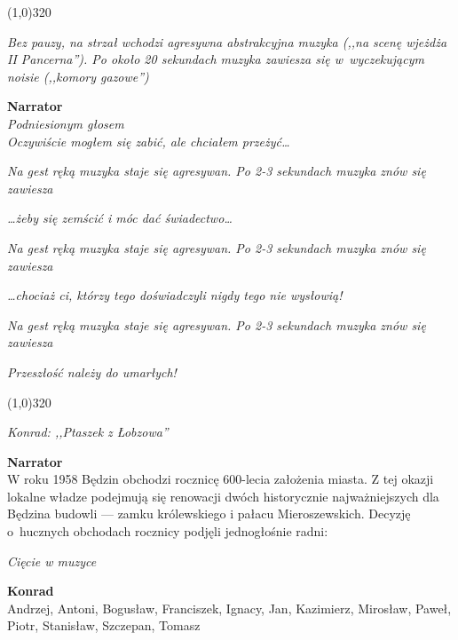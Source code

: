 \documentclass[11pt,a4paper,oneside]{article}
\begin{document}
\line(1,0){320}

{\color{light-gray} \emph{Bez pauzy, na strzał wchodzi agresywna
abstrakcyjna muzyka (,,na scenę wjeżdża II Pancerna''). Po około 20
sekundach muzyka zawiesza się w~wyczekującym noisie (,,komory
gazowe'')}}

\textbf{Narrator}\\
{\color{light-gray} \emph{Podniesionym głosem}}\\
\emph{Oczywiście mogłem się zabić, ale chciałem przeżyć\dots{}} 

{\color{light-gray} \emph{Na gest ręką muzyka staje się agresywan. Po
2-3 sekundach muzyka znów się zawiesza}}

\emph{\dots{}żeby się zemścić i móc dać świadectwo\dots{}}

{\color{light-gray} \emph{Na gest ręką muzyka staje się agresywan. Po
2-3 sekundach muzyka znów się zawiesza}}

\emph{\dots{}chociaż ci, którzy tego doświadczyli nigdy tego nie wysłowią!}

{\color{light-gray} \emph{Na gest ręką muzyka staje się agresywan. Po
2-3 sekundach muzyka znów się zawiesza}}

\emph{Przeszłość należy do umarłych!}

\line(1,0){320}

{\color{konrad}   \emph{Konrad: ,,Ptaszek z Łobzowa''}}

\textbf{Narrator}\\
W roku 1958 Będzin obchodzi rocznicę 600-lecia założenia miasta.
Z tej okazji lokalne władze podejmują się renowacji dwóch historycznie
najważniejszych dla Będzina budowli --- zamku królewskiego i pałacu
Mieroszewskich. Decyzję o~hucznych obchodach rocznicy podjęli
jednogłośnie radni:

{\color{light-gray} \emph{Cięcie w muzyce}}

{\color{konrad}
\textbf{Konrad}\\
Andrzej, Antoni, Bogusław, Franciszek, Ignacy, Jan, Kazimierz, Mirosław, 
Paweł, Piotr, Stanisław, Szczepan, Tomasz
}
\end{document}
